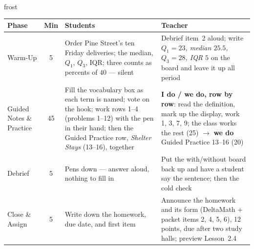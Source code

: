 \documentclass[10pt]{article}
\begin{document}
\begin{fixedskillbox}{frost}
\renewcommand{\arraystretch}{1.25}
\begin{tabularx}{\linewidth}{@{}l c X X@{}}
\textbf{Phase} & \textbf{Min} & \textbf{Students} & \textbf{Teacher} \\
\hline
Warm-Up & 5 & Order Pine Street's ten Friday deliveries; the median, $Q_1$, $Q_3$, IQR; three
  counts as percents of $40$ --- silent & Debrief item~2 aloud; write
  \emph{$Q_1 = 23$, median $25.5$, $Q_3 = 28$, IQR $5$} on the board and leave it up all
  period \\
Guided Notes \& Practice & 45 & Fill the vocabulary box as each term is named; vote on the
  hook; work rows 1--4 (problems 1--12) with the pen in their hand; then the Guided Practice
  row, \emph{Shelter Stays} (13--16), together & \textbf{I do / we do, row by row}: read the
  definition, mark up the display, work 1, 3, 7, 9; the class works the rest (25) $\to$
  \textbf{we do} Guided Practice 13--16 (20) \\
Debrief & 5 & Pens down --- answer aloud, nothing to fill in & Put the with/without board back
  up and have a student say the sentence; then the cold check \\
Close \& Assign & 5 & Write down the homework, due date, and first item & Announce the
  homework and its form (DeltaMath + packet items 2, 4, 5, 6), 12 points, due after two study halls; preview Lesson~2.4 \\
\end{tabularx}
\end{fixedskillbox}
\end{document}
